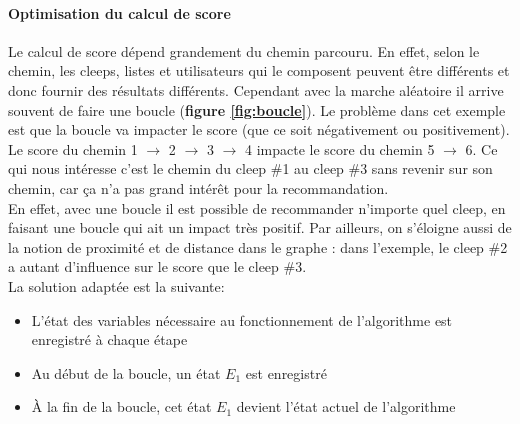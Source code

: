 \documentclass{article} %
\begin{document}
\paragraph{Optimisation du calcul de score\\}
Le calcul de score dépend grandement du chemin parcouru. En effet, selon le chemin, les cleeps, listes et utilisateurs qui le composent peuvent être différents et donc fournir des résultats différents. Cependant avec la marche aléatoire il arrive souvent de faire une boucle (\textbf{figure \ref{fig:boucle}}). Le problème dans cet exemple est que la boucle va impacter le score (que ce soit négativement ou positivement). Le score du chemin 1 $\rightarrow$ 2 $\rightarrow$ 3 $\rightarrow$ 4 impacte le score du chemin 5 $\rightarrow$ 6. Ce qui nous intéresse c'est le chemin du cleep \#1 au cleep \#3 sans revenir sur son chemin, car ça n'a pas grand intérêt pour la recommandation.\\
En effet, avec une boucle il est possible de recommander n'importe quel cleep, en faisant une boucle qui ait un impact très positif. Par ailleurs, on s'éloigne aussi de la notion de proximité et de distance dans le graphe : dans l'exemple, le cleep \#2 a autant d'influence sur le score que le cleep \#3.\\
La solution adaptée est la suivante:
\begin{itemize}
 \item L'état des variables nécessaire au fonctionnement de l'algorithme est enregistré à chaque étape
 \item Au début de la boucle, un état $E_{1}$ est enregistré
 \item À la fin de la boucle, cet état $E_{1}$ devient l'état actuel de l'algorithme
\end{itemize}
\end{document}
